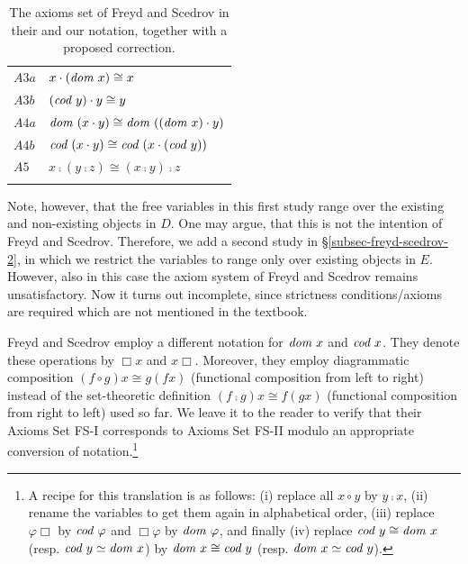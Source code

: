 \begin{table}
\begin{tabular}{ll}
  $A3a$  & $x \cdot (\textit{dom \/} x) \cong x$ \\ 
  $A3b$ & $(\textit{cod \/} y) \cdot y \cong y$ \\
  $A4a$ & $\textit{dom \/}(x \cdot y) \cong \textit{dom \/}((\textit{dom \/} x) \cdot y)$ \\ 
  $A4b$ & $\textit{cod \/}(x \cdot y) \cong \textit{cod \/}(x \cdot (\textit{cod \/} y))$ \\ 
  $A5$   & $x \comp (y \comp z) \cong  (x \comp y) \comp z$   \\
\\
\hline
\end{tabular}
\caption{The axioms set of Freyd and Scedrov in their and our
  notation, together with a proposed correction.\label{axioms-sets-2}}
\end{table}


 Note, however, that the free variables in this first study range over
 the existing and non-existing objects in $D$. One may argue,
 that this is not the intention of Freyd and
 Scedrov. Therefore, we add a second study in \S\ref{subsec-freyd-scedrov-2}, in which we restrict the
 variables to range only over existing objects in $E$. However, also in this case
 the axiom system of Freyd and Scedrov remains unsatisfactory. Now it
 turns out incomplete, 
 since strictness conditions/axioms are required which are not mentioned in
 the textbook.

  Freyd and Scedrov employ a different notation for $\textit{dom \/} x$ and $\textit{cod \/}
 x$. They denote these operations by $\Box x$ 
  and $x\Box$. Moreover, they employ diagrammatic composition $(f \circ
  g) x \cong g(f x)$ (functional composition from left to right) instead of the set-theoretic 
  definition $(f \comp g) x \cong f(g x)$ (functional composition from right to left) used so far.
  We leave it to the reader to verify that their Axioms
  Set FS-I corresponds to Axioms
  Set FS-II modulo an appropriate conversion of notation.\footnote{A recipe for 
  this translation is as follows: (i) replace all $x \circ y$ by
  $y \comp x$, (ii) rename the variables to get them again in alphabetical order,
(iii) replace $\varphi\Box$ by $\textit{cod \/} \varphi$ and $\Box\varphi$  by $\textit{dom \/} \varphi$, and finally
(iv) replace $\textit{cod \/} y \cong \textit{dom \/} x$ (resp. $\textit{cod \/} y \simeq \textit{dom \/} x$) 
   by $\textit{dom \/} x \cong \textit{cod \/} y$ (resp. $\textit{dom \/} x \simeq \textit{cod \/} y$).}

